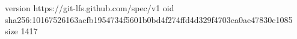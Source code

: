 version https://git-lfs.github.com/spec/v1
oid sha256:10167526163acfb1954734f5601b0bd4f274ffd4d329f4703ea0ae47830c1085
size 1417
